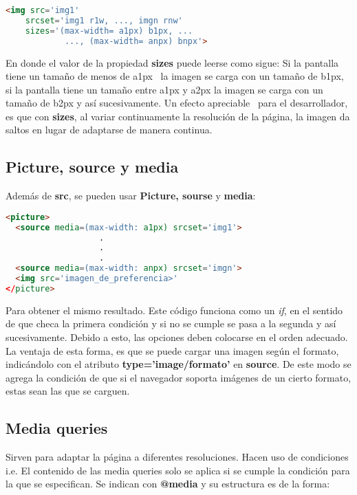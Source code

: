 \documentclass[10pt,oneside]{article}
\begin{document}
\begin{multicols}{2}
    \begin{lstlisting}[language=HTML]
<img src='img1' 
    srcset='img1 r1w, ..., imgn rnw'
    sizes='(max-width= a1px) b1px, ...
            ..., (max-width= anpx) bnpx'>
    \end{lstlisting}
    En donde el valor de la propiedad \textbf{sizes} puede leerse como sigue: Si la pantalla tiene un tamaño de menos de a1px  la imagen se carga con un tamaño de b1px, si la pantalla tiene un tamaño entre a1px y a2px la imagen se carga con un tamaño de b2px y así sucesivamente. Un efecto apreciable  para el desarrollador, es que con \textbf{sizes}, al variar continuamente la resolución de la página, la imagen da saltos en lugar de adaptarse de manera continua. 

\subsection{Picture, source y media}

    Además de \textbf{src}, se pueden usar \textbf{Picture, sourse} y \textbf{media}:

    \begin{lstlisting}[language=HTML]
<picture>
  <source media=(max-width: a1px) srcset='img1'>
                   .
                   .
                   .
  <source media=(max-width: anpx) srcset='imgn'>
  <img src='imagen_de_preferencia>'
</picture>
    \end{lstlisting}

    Para obtener el mismo resultado. Este código funciona como un \textit{if}, en el sentido de que checa la primera condición y si no se cumple se pasa a la segunda y así sucesivamente. Debido a esto, las opciones deben colocarse en el orden adecuado. La ventaja de esta forma, es que se puede cargar una imagen según el formato, indicándolo con el atributo \textbf{type='image/formato'} en \textbf{source}. De este modo se agrega la condición de que si el navegador soporta imágenes de un cierto formato, estas sean las que se carguen. 

\subsection{Media queries}

    Sirven para adaptar la página a diferentes resoluciones. Hacen uso de condiciones i.e.  El contenido de las media queries solo se aplica si se cumple la condición para la que se especifican. Se indican con \textbf{@media} y su estructura es de la forma:


\end{multicols}
\end{document}
